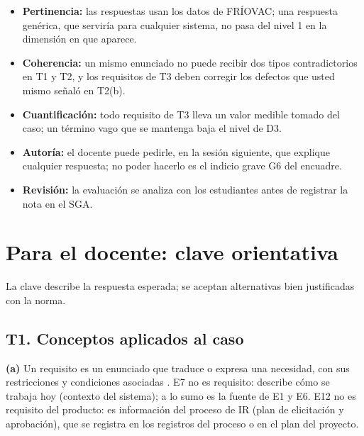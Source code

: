 \documentclass[11pt]{article}
\newif\ifclave
\newcommand{\seccion}[1]{\section{\textcolor{utegreendk}{#1}}}
\newcommand{\subseccion}[1]{\subsection{\textcolor{midblue}{#1}}}
\begin{document}
\begin{itemize}[leftmargin=18pt,itemsep=2pt]

	\item \textbf{Pertinencia:} las respuestas usan los datos de FRÍOVAC; una respuesta genérica, que serviría para cualquier sistema, no pasa del nivel 1 en la dimensión en que aparece.

	\item \textbf{Coherencia:} un mismo enunciado no puede recibir dos tipos contradictorios en T1 y T2, y los requisitos de T3 deben corregir los defectos que usted mismo señaló en T2(b).

	\item \textbf{Cuantificación:} todo requisito de T3 lleva un valor medible tomado del caso; un término vago que se mantenga baja el nivel de D3.

	\item \textbf{Autoría:} el docente puede pedirle, en la sesión siguiente, que explique cualquier respuesta; no poder hacerlo es el indicio grave G6 del encuadre.

	\item \textbf{Revisión:} la evaluación se analiza con los estudiantes antes de registrar la nota en el SGA.

\end{itemize}




\ifclave


\newpage

\seccion{Para el docente: clave orientativa}



La clave describe la respuesta esperada; se aceptan alternativas bien justificadas con la norma.



\subseccion{T1. Conceptos aplicados al caso}



\textbf{(a)} Un requisito es un enunciado que traduce o expresa una necesidad, con sus restricciones y condiciones asociadas \citep{iso29148_2018}. E7 no es requisito: describe cómo se trabaja hoy (contexto del sistema); a lo sumo es la fuente de E1 y E6. E12 no es requisito del producto: es información del proceso de IR (plan de elicitación y aprobación), que se registra en los registros del proceso o en el plan del proyecto.
\end{document}
